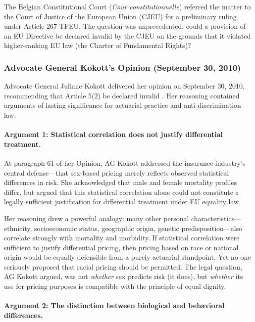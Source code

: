 \documentclass[12pt,a4paper]{article}
\begin{document}
The Belgian Constitutional Court (\emph{Cour constitutionnelle}) referred the matter to the Court of Justice of the European Union (CJEU) for a preliminary ruling under Article 267 TFEU. The question was unprecedented: could a provision of an EU Directive be declared invalid by the CJEU on the grounds that it violated higher-ranking EU law (the Charter of Fundamental Rights)?

\subsubsection{Advocate General Kokott's Opinion (September 30, 2010)}

Advocate General Juliane Kokott delivered her opinion on September 30, 2010, recommending that Article 5(2) be declared invalid \cite{kokott2010}. Her reasoning contained arguments of lasting significance for actuarial practice and anti-discrimination law.

\paragraph{Argument 1: Statistical correlation does not justify differential treatment.}

At paragraph 61 of her Opinion, AG Kokott addressed the insurance industry's central defense---that sex-based pricing merely reflects observed statistical differences in risk. She acknowledged that male and female mortality profiles differ, but argued that this statistical correlation alone could not constitute a legally sufficient justification for differential treatment under EU equality law.

Her reasoning drew a powerful analogy: many other personal characteristics---ethnicity, socioeconomic status, geographic origin, genetic predisposition---also correlate strongly with mortality and morbidity. If statistical correlation were sufficient to justify differential pricing, then pricing based on race or national origin would be equally defensible from a purely actuarial standpoint. Yet no one seriously proposed that racial pricing should be permitted. The legal question, AG Kokott argued, was not \emph{whether} sex predicts risk (it does), but \emph{whether} its use for pricing purposes is compatible with the principle of equal dignity.

\paragraph{Argument 2: The distinction between biological and behavioral differences.}
\end{document}
